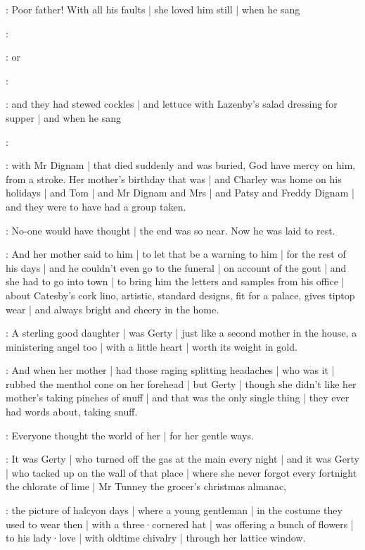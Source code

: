 \gertyNovel:
Poor father!
With all his faults |
she loved him still |
when he sang

\Father:
\stage{[singing]}

\gertyReal:
or

\Father:
\stage{[singing]}

\gertyNovel:
and they had stewed cockles |
and lettuce with Lazenby's salad dressing for supper |
and when he sang

\Father:
\stage{[singing]}

\gertyReal:
with Mr Dignam |
that died suddenly and was buried,
God have mercy on him,
from a stroke.
Her mother's birthday that was |
and Charley was home on his holidays |
and Tom |
and Mr Dignam and Mrs |
and Patsy and Freddy Dignam |
and they were to have had a group taken.

\gertyNovel:
No-one would have thought |
the end was so near.
Now he was laid to rest.

\gertyReal:
And her mother said to him |%
to let that be a warning to him |
for the rest of his days |
and he couldn't even go to the funeral |
on account of the gout |
and she had to go into town |
to bring him the letters and samples
from his office |
about Catesby's cork lino,
artistic,
standard designs,
fit for a palace,
gives tiptop wear |
and always bright and cheery in the home.

\gertyNovel:
A sterling good daughter |
was Gerty |
just like a second mother in the house,
a ministering angel too |
with a little heart |
worth its weight in gold.

\gertyReal:
And when her mother |
had those raging splitting headaches |
who was it |
rubbed the menthol cone on her forehead |
but Gerty |
though she didn't like her mother's taking pinches of snuff |
and that was the only single thing |
they ever had words about,
taking snuff.%

\gertyNovel:
Everyone thought the world of her |
for her gentle ways.

\gertyReal:
It was Gerty |
who turned off the gas at the main every night |
and it was Gerty |
who tacked up on the wall of that place |
where she never forgot every fortnight the chlorate of lime |
Mr Tunney the grocer's christmas almanac,

\gertyNovel:
the picture of halcyon days |
where a young gentleman |
in the costume they used to wear then |
with a three·cornered hat |
was offering a bunch of flowers |
to his lady·love |
with oldtime chivalry |
through her lattice window.

